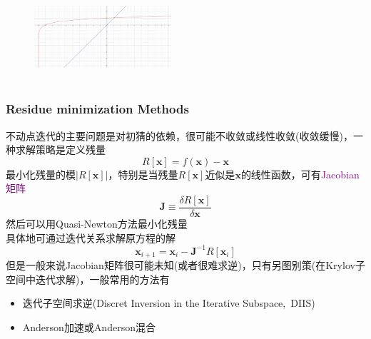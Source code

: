 {{\begin{minipage}[b]{0.35\textwidth}
\end{minipage}
\hfill
\begin{minipage}[b]{0.62\textwidth}
\begin{figure}[h!]
	\vspace{-0.21in}
\centering
\includegraphics[height=1.3in,width=2.0in,viewport=0 0 2500 1600,clip]{Figures/solve_lg10.png}
\label{solution-log_10}
\end{figure}
\end{minipage}
}

\frame
{
	\frametitle{\textrm{Residue minimization Methods}}
不动点迭代的主要问题是对初猜的依赖，很可能不收敛或线性收敛(收敛缓慢)，一种求解策略是定义残量
	\begin{displaymath}
		R[\mathbf{x}]=f(\mathbf{x})-\mathbf{x}
	\end{displaymath}
	最小化残量的模$|R[\mathbf{x}]|$，特别是当残量$R[\mathbf{x}]$近似是$\mathbf{x}$的线性函数，可有\textcolor{purple}{\textrm{Jacobian}矩阵}
	\begin{displaymath}
		\mathbf{J}\equiv\dfrac{\delta R[\mathbf{x}]}{\delta\mathbf{x}}
	\end{displaymath}
	然后可以用\textrm{Quasi-Newton}方法最小化残量\\具体地可通过迭代关系求解原方程的解
	\begin{displaymath}
		\mathbf{x}_{i+1}=\mathbf{x}_{i}-\mathbf{J}^{-1}R[\mathbf{x}_{i}]
	\end{displaymath}
		但是一般来说\textrm{Jacobian}矩阵很可能未知(或者很难求逆)，只有另图别策(在\textrm{Krylov}子空间中迭代求解)，一般常用的方法有
		\begin{itemize}
			\item 迭代子空间求逆(\textrm{Discret Inversion in the Iterative Subspace,~DIIS})
			\item \textrm{Anderson}加速或\textrm{Anderson}混合
		\end{itemize}
}
	
}
